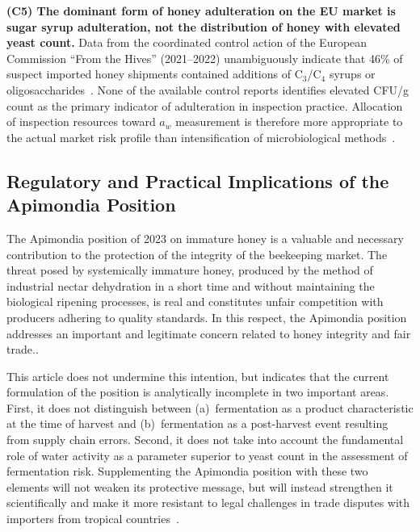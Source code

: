 \textbf{(C5) The dominant form of honey adulteration on the EU market is sugar syrup adulteration, not the distribution of honey with elevated yeast count.}
Data from the coordinated control action of the European Commission
``From the Hives'' (2021--2022) unambiguously indicate that 46\%
of suspect imported honey shipments contained additions of
C$_3$/C$_4$ syrups or oligosaccharides~\cite{eufromhives2021}.
None of the available control reports identifies elevated CFU/g
count as the primary indicator of adulteration in inspection
practice. Allocation of inspection resources toward $a_w$
measurement is therefore more appropriate to the actual market
risk profile than intensification of microbiological
methods~\cite{schoder2026,eufromhives2021}.

\subsection{Regulatory and Practical Implications of the Apimondia Position}

The Apimondia position of 2023 on immature honey is a valuable and
necessary contribution to the protection of the integrity of the
beekeeping market. The threat posed by systemically immature honey,
produced by the method of industrial nectar dehydration in a short
time and without maintaining the biological ripening processes, is
real and constitutes unfair competition with producers adhering to
quality standards. In this respect, the Apimondia position addresses an important and legitimate concern related to honey integrity and fair trade..

This article does not undermine this intention, but indicates that
the current formulation of the position is analytically incomplete
in two important areas. First, it does not distinguish between
(a)~fermentation as a product characteristic at the time of harvest
and (b)~fermentation as a post-harvest event resulting from supply
chain errors. Second, it does not take into account the fundamental
role of water activity as a parameter superior to yeast count in the
assessment of fermentation risk. Supplementing the Apimondia position
with these two elements will not weaken its protective message, but
will instead strengthen it scientifically and make it more resistant
to legal challenges in trade disputes with importers from tropical
countries~\cite{ruegg1981,tadele2025,analytica2020}.

